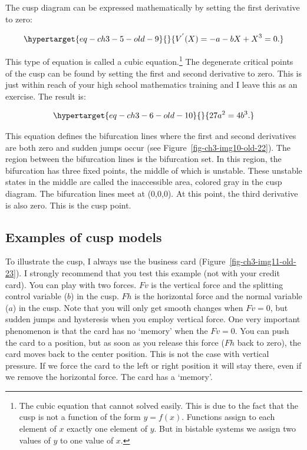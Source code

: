 \documentclass[
  letterpaper,
]{scrbook}
\begin{document}
The cusp diagram can be expressed mathematically by setting the first
derivative to zero:

\begin{equation}\protect\hypertarget{eq-ch3-5-old-9}{}{
V^{'}(X) = {- a - bX + X}^{3} = 0.
}\label{eq-ch3-5-old-9}\end{equation}

This type of equation is called a cubic equation.\footnote{The cubic
  equation that cannot solved easily. This is due to the fact that the
  cusp is not a function of the form \(y = f(x)\). Functions assign to
  each element of \(x\) exactly one element of \(y\). But in bistable
  systems we assign two values of \(y\) to one value of \(x\).} The
degenerate critical points of the cusp can be found by setting the first
and second derivative to zero. This is just within reach of your high
school mathematics training and I leave this as an exercise. The result
is:

\begin{equation}\protect\hypertarget{eq-ch3-6-old-10}{}{
27a^{2} = 4b^{3}.
}\label{eq-ch3-6-old-10}\end{equation}

This equation defines the bifurcation lines where the first and second
derivatives are both zero and sudden jumps occur (see
Figure~\ref{fig-ch3-img10-old-22}). The region between the bifurcation
lines is the bifurcation set. In this region, the bifurcation has three
fixed points, the middle of which is unstable. These unstable states in
the middle are called the inaccessible area, colored gray in the cusp
diagram. The bifurcation lines meet at (0,0,0). At this point, the third
derivative is also zero. This is the cusp point.

\hypertarget{examples-of-cusp-models}{%
\subsection{Examples of cusp models}\label{examples-of-cusp-models}}

To illustrate the cusp, I always use the business card
(Figure~\ref{fig-ch3-img11-old-23}). I strongly recommend that you test
this example (not with your credit card). You can play with two forces.
\(Fv\) is the vertical force and the splitting control variable (\(b\))
in the cusp. \(Fh\) is the horizontal force and the normal variable
(\(a\)) in the cusp. Note that you will only get smooth changes when
\(Fv = 0\), but sudden jumps and hysteresis when you employ vertical
force. One very important phenomenon is that the card has no `memory'
when the \(Fv = 0\). You can push the card to a position, but as soon as
you release this force (\(Fh\) back to zero), the card moves back to the
center position. This is not the case with vertical pressure. If we
force the card to the left or right position it will stay there, even if
we remove the horizontal force. The card has a `memory'.
\end{document}

